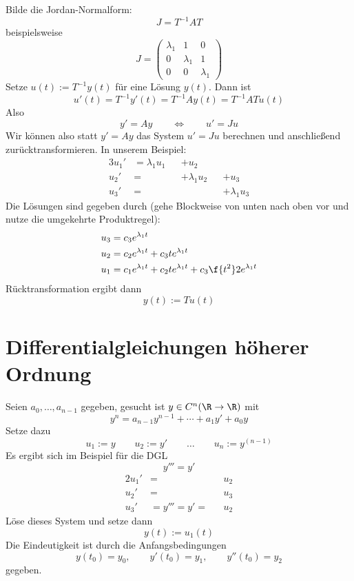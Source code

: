 \documentclass[a4paper,10pt]{scrbook}
\begin{document}
\begin{seg}
	Bilde die Jordan-Normalform:
	\[
		J = T^{-1} A T
	\]
	beispielsweise
	\[
		J = \begin{pmatrix}
			\lambda_1 & 1 & 0\\
			0 & \lambda_1 & 1 \\
			0 & 0 & \lambda_1
		\end{pmatrix}
	\]
	Setze $u(t) := T^{-1} y(t)$ für eine Lösung $y(t)$.
	Dann ist
	\[
		u'(t) = T^{-1}y'(t) = T^{-1}Ay(t) = T^{-1}AT u(t)
	\]
	Also
	\[
		y' = Ay
		\qquad \iff \qquad
		u' = Ju
	\]
	Wir können also statt $y' = Ay$ das System $u' = Ju$ berechnen und anschließend zurücktransformieren.
	In unserem Beispiel:
	\begin{alignat*}{3}
		u_1' &= \lambda_1 u_1& &+ u_2 \\
		u_2' &= &&+ \lambda_1 u_2 && + u_3 \\
		u_3' &= && &&+\lambda_1 u_3
	\end{alignat*}
	Die Lösungen sind gegeben durch (gehe Blockweise von unten nach oben vor und nutze die umgekehrte Produktregel):
	\begin{align*}
		u_3 &= c_3 e^{\lambda_1 t} \\
		u_2 &= c_2 e^{\lambda_1 t} + c_3 t e^{\lambda_1 t} \\
		u_1 &= c_1 e^{\lambda_1 t} + c_2 t e^{\lambda_1 t} + c_3 \f {t^2}2 e^{\lambda_1 t} \\
	\end{align*}
	Rücktransformation ergibt dann
	\[
		y(t) := T u(t)
	\]
\end{seg}


\section{Differentialgleichungen höherer Ordnung} %


Seien $a_0, \dotsc, a_{n-1}$ gegeben, gesucht ist $y \in C^n (\R \to \R)$ mit
\[
	y^{n} = a_{n-1} y^{n-1} + \dotsb + a_1 y' + a_0 y
\]
Setze dazu
\[
	u_1 := y \qquad u_2 := y' \qquad \dotsc \qquad u_n := y^{(n-1)}
\]
Es ergibt sich im Beispiel für die DGL
\[
	y''' = y'
\]
\begin{alignat*}{2}
	u_1' &= &&u_2 \\
	u_2' &= &&u_3 \\
	u_3' &= y''' = y' = &&u_2
\end{alignat*}
Löse dieses System und setze dann
\[
	y(t) := u_1(t)
\]
Die Eindeutigkeit ist durch die Anfangsbedingungen
\[
	y(t_0) = y_0, \qquad y'(t_0) = y_1, \qquad y''(t_0) = y_2
\]
gegeben.
\end{document}
